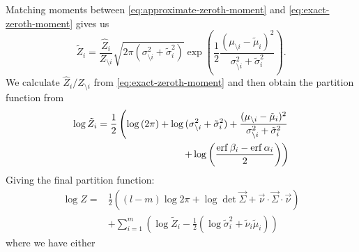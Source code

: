 \documentclass[11pt,twoside]{report}
\begin{document}
Matching moments between \eqref{eq:approximate-zeroth-moment} and \eqref{eq:exact-zeroth-moment} gives us
\begin{equation}
  \tilde{Z}_i = \frac{\hat{Z}_i}{Z_{\setminus i}}
  \sqrt{2 \pi (\sigma_{\setminus i}^2 + \tilde{\sigma}_i^2)}
  \exp{\left(
    \frac{1}{2}
    \frac{(\mu_{\setminus i} - \tilde{\mu}_i)^2}{\sigma_{\setminus i}^2 + \tilde{\sigma}_i^2}
    \right)}.
\end{equation}
We calculate $\hat{Z}_i / Z_{\setminus i}$ from \eqref{eq:exact-zeroth-moment} and then obtain the partition function from
\begin{equation}
  \begin{split}
    \log{\tilde{Z}_i}
    =
    \frac{1}{2} \left(
    \log{(2\pi)} +
    \log{(\sigma_{\setminus i}^2 + \tilde{\sigma}_i^2)} +
    \frac{(\mu_{\setminus i} - \tilde{\mu}_i)^2}{\sigma_{\setminus i}^2 + \tilde{\sigma}_i^2}
    \right.&
    \\
    \left.
    + \log{\left(\frac{\operatorname{erf}{\beta_i} - \operatorname{erf}{\alpha_i}}{2}\right)}
    \right)&
  \end{split}
\end{equation}
Giving the final partition function:
\begin{equation}
  \begin{split}
    \log{Z}
    =&
    \frac{1}{2} \left(
    (l-m) \log{2\pi}
    + \log\det{\vec{\Sigma}}
    + \vec{\nu} \cdot \vec{\Sigma} \cdot \vec{\nu}
    \right)
    \\ &
    + \sum_{i=1}^m \left(
    \log{\tilde{Z}_i}
    - \frac{1}{2}
    \left(
    \log{\tilde{\sigma}_i^2}
    + \tilde{\nu}_i \tilde{\mu}_i
    \right)
    \right)
  \end{split}
\end{equation}
where we have either
\end{document}
